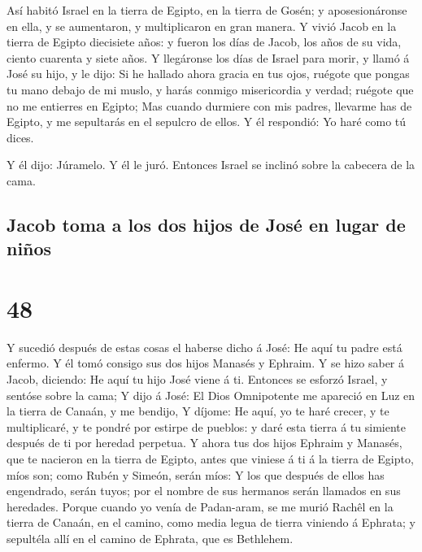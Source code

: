  Así habitó Israel en la tierra de Egipto, en la tierra
de Gosén; y aposesionáronse en ella, y se aumentaron, y multiplicaron en
gran manera.  Y vivió Jacob en la tierra de Egipto
diecisiete años: y fueron los días de Jacob, los años de su vida, ciento
cuarenta y siete años.  Y llegáronse los días de Israel
para morir, y llamó á José su hijo, y le dijo: Si he hallado ahora
gracia en tus ojos, ruégote que pongas tu mano debajo de mi muslo, y
harás conmigo misericordia y verdad; ruégote que no me entierres en
Egipto;  Mas cuando durmiere con mis padres, llevarme has
de Egipto, y me sepultarás en el sepulcro de ellos. Y él respondió: Yo
haré como tú dices.

 Y él dijo: Júramelo. Y él le juró. Entonces Israel se
inclinó sobre la cabecera de la cama.

\hypertarget{jacob-toma-a-los-dos-hijos-de-josuxe9-en-lugar-de-niuxf1os}{%
\subsection{Jacob toma a los dos hijos de José en lugar de
niños}\label{jacob-toma-a-los-dos-hijos-de-josuxe9-en-lugar-de-niuxf1os}}

\hypertarget{section-47}{%
\section{48}\label{section-47}}

 Y sucedió después de estas cosas el haberse dicho á José:
He aquí tu padre está enfermo. Y él tomó consigo sus dos hijos Manasés y
Ephraim.  Y se hizo saber á Jacob, diciendo: He aquí tu
hijo José viene á ti. Entonces se esforzó Israel, y sentóse sobre la
cama;  Y dijo á José: El Dios Omnipotente me apareció en
Luz en la tierra de Canaán, y me bendijo,  Y díjome: He
aquí, yo te haré crecer, y te multiplicaré, y te pondré por estirpe de
pueblos: y daré esta tierra á tu simiente después de ti por heredad
perpetua.  Y ahora tus dos hijos Ephraim y Manasés, que te
nacieron en la tierra de Egipto, antes que viniese á ti á la tierra de
Egipto, míos son; como Rubén y Simeón, serán míos:  Y los
que después de ellos has engendrado, serán tuyos; por el nombre de sus
hermanos serán llamados en sus heredades.  Porque cuando
yo venía de Padan-aram, se me murió Rachêl en la tierra de Canaán, en el
camino, como media legua de tierra viniendo á Ephrata; y sepultéla allí
en el camino de Ephrata, que es Bethlehem.

